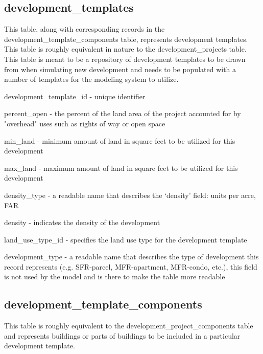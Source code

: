 \subsection{development\_templates} 

This table, along with corresponding records in the development\_template\_components table, represents development templates. This table is roughly equivalent in nature to the development\_projects table. This table is meant to be a repository of development templates to be drawn from when simulating new development and needs to be populated with a number of templates for the modeling system to utilize.

\begin{description}
\item development\_template\_id - unique identifier
\item percent\_open - the percent of the land area of the project accounted for by "overhead" uses such as rights of way or open space
\item min\_land - minimum amount of land in square feet to be utilized for this development
\item max\_land - maximum amount of land in square feet to be utilized for this development
\item density\_type - a readable name that describes the `density' field: units per acre, FAR
\item density - indicates the density of the development
\item land\_use\_type\_id - specifies the land use type for the development template
\item development\_type - a readable name that describes the type of development this record represents (e.g. SFR-parcel, MFR-apartment, MFR-condo, etc.), this field is not used by the model and is there to make the table more readable 
\end{description}

\subsection{development\_template\_components} 

This table is roughly equivalent to the development\_project\_components table and represents buildings or parts of buildings to be included in a particular development template.

